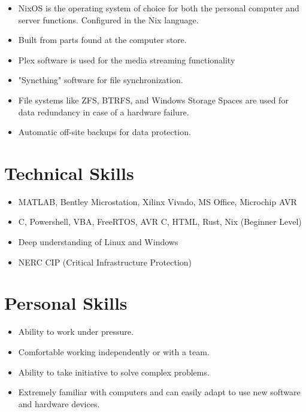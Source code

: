 \documentclass{lsanche_cv}
\begin{document}
\begin{multicols*}{2}
      \begin{itemize}
        \item NixOS is the operating system of choice for both the personal computer and server functions. Configured in the Nix language.
        \item Built from parts found at the computer store.
        \item Plex software is used for the media streaming functionality
        \item "Syncthing" software for file synchronization.
        \item File systems like ZFS, BTRFS, and Windows Storage Spaces are used for data redundancy in case of a hardware failure.
				\item Automatic off-site backups for data protection.
      \end{itemize}

    \section{Technical Skills}
      \begin{itemize}
        \item MATLAB, Bentley Microstation, Xilinx Vivado, MS Office, Microchip AVR
        \item C, Powershell, VBA, FreeRTOS, AVR C, HTML, Rust, Nix (Beginner Level)
        \item Deep understanding of Linux and Windows
        \item NERC CIP (Critical Infrastructure Protection)
      \end{itemize}
    
    \section{Personal Skills}
      \begin{itemize}
        \item Ability to work under pressure.
        \item Comfortable working independently or with a team.
        \item Ability to take initiative to solve complex problems.
        \item Extremely familiar with computers and can easily adapt to use new software and hardware devices.
      \end{itemize}
\end{multicols*}
\end{document}
